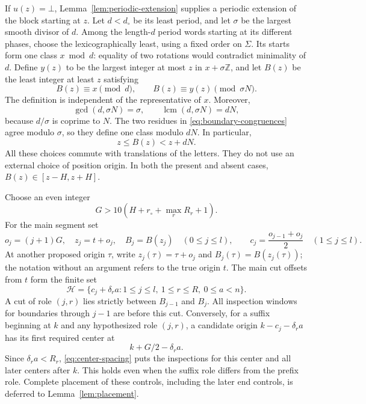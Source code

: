 If $u(z)=\bot$, Lemma~\ref{lem:periodic-extension} supplies a periodic
extension of the block starting at $z$.  Let $d<d_\circ$ be its least
period, and let $\sigma$ be the largest smooth divisor of $d$.  Among
the length-$d$ period words starting at its different phases, choose
the lexicographically least, using a fixed order on $\Sigma$.  Its
starts form one class $x\bmod d$: equality of two rotations would
contradict minimality of $d$.  Define $y(z)$ to be the largest integer
at most $z$ in $x+\sigma\mathbb Z$, and let $B(z)$ be the least integer
at least $z$ satisfying
\begin{equation}\label{eq:boundary-congruences}
                  B(z)\equiv x\pmod d,\qquad
                  B(z)\equiv y(z)\pmod{\sigma N}.
\end{equation}
The definition is independent of the representative of $x$.  Moreover,
\[
 \gcd(d,\sigma N)=\sigma,\qquad
 \operatorname{lcm}(d,\sigma N)=dN,
\]
because $d/\sigma$ is coprime to $N$.  The two residues in
\eqref{eq:boundary-congruences} agree modulo $\sigma$, so they define
one class modulo $dN$.  In particular,
\begin{equation}\label{eq:periodic-boundary-range}
                            z\leq B(z)<z+dN.
\end{equation}
All these choices commute with translations of the letters.  They
do not use an external choice of position origin.  In both the present
and absent cases, $B(z)\in[z-H,z+H]$.

Choose an even integer
\begin{equation}\label{eq:center-spacing}
                    G>10(H+r_\circ+\max_r R_r+1).
\end{equation}
For the main segment set
\[
 o_j=(j+1)G,\quad z_j=t+o_j,\quad B_j=B(z_j)
       \quad(0\leq j\leq l),
 \qquad c_j=\frac{o_{j-1}+o_j}{2}\quad(1\leq j\leq l).
\]
At another proposed origin $\tau$, write
$z_j(\tau)=\tau+o_j$ and $B_j(\tau)=B(z_j(\tau))$; the notation
without an argument refers to the true origin $t$.
The main cut offsets from $t$ form the finite set
\begin{equation}\label{eq:main-cuts}
 \mathcal H=
 \{c_j+\delta_r a:1\leq j\leq l,\ 1\leq r\leq R,\ 0\leq a<n\}.
\end{equation}
A cut of role $(j,r)$ lies strictly between $B_{j-1}$ and $B_j$.
All inspection windows for boundaries through $j-1$ are before this
cut.  Conversely, for a suffix beginning at $k$ and any hypothesized
role $(j,r)$, a candidate origin $k-c_j-\delta_r a$ has its first
required center at
\begin{equation}\label{eq:suffix-first-center}
                       k+G/2-\delta_r a.
\end{equation}
Since $\delta_r a<R_r$, \eqref{eq:center-spacing} puts the inspections
for this center and all later centers after $k$.  This holds even when
the suffix role differs from the prefix role.  Complete placement of
these controls, including the later end controls, is deferred to
Lemma~\ref{lem:placement}.

